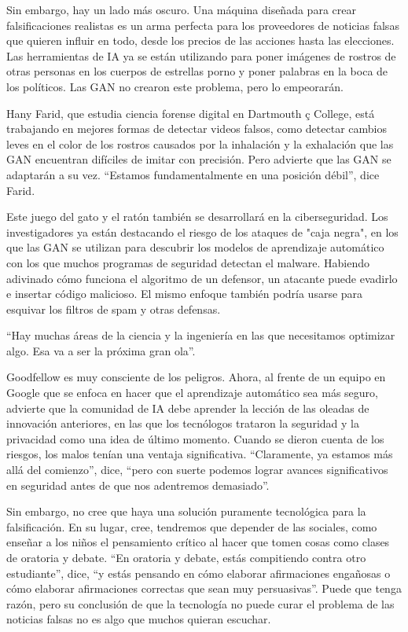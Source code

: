 \documentclass[a4paper]{article}
\begin{document}
Sin embargo, hay un lado más oscuro. Una máquina diseñada para crear falsificaciones realistas 
es un arma perfecta para los proveedores de noticias falsas que quieren influir en todo, desde 
los precios de las acciones hasta las elecciones. Las herramientas de IA ya se están utilizando 
para poner imágenes de rostros de otras personas en los cuerpos de estrellas porno y poner 
palabras en la boca de los políticos. Las GAN no crearon este problema, pero lo empeorarán.
 
Hany Farid, que estudia ciencia forense digital en Dartmouth ç College, está trabajando en 
mejores formas de detectar videos  falsos, como detectar cambios leves en el color de los 
rostros  causados por la inhalación y la exhalación que las GAN encuentran difíciles de imitar 
con precisión. Pero advierte que las GAN se  adaptarán a su vez. ``Estamos fundamentalmente en 
una posición  débil'', dice Farid.


Este juego del gato y el ratón también se desarrollará en la ciberseguridad. Los investigadores 
ya están destacando el riesgo de los ataques de "caja negra", en los que las GAN se utilizan 
para descubrir los modelos de aprendizaje automático con los que muchos programas de seguridad 
detectan el malware. Habiendo adivinado cómo funciona el algoritmo de un defensor, un atacante 
puede evadirlo e insertar código malicioso. El mismo enfoque también podría usarse para esquivar 
los filtros de spam y otras defensas.

``Hay muchas áreas de la ciencia y la ingeniería en las que necesitamos optimizar algo. Esa va 
a ser la próxima gran ola''.

Goodfellow es muy consciente de los peligros. Ahora, al frente de un equipo en Google que se 
enfoca en hacer que el aprendizaje automático sea más seguro, advierte que la comunidad de IA 
debe aprender la lección de las oleadas de innovación anteriores, en las que los tecnólogos 
trataron la seguridad y la privacidad como una idea de último momento. Cuando se dieron cuenta 
de los riesgos, los malos tenían una ventaja significativa. ``Claramente, ya estamos más allá 
del comienzo'', dice, ``pero con suerte podemos lograr avances significativos en seguridad antes 
de que nos adentremos demasiado''.

Sin embargo, no cree que haya una solución puramente tecnológica para la falsificación. En su 
lugar, cree, tendremos que depender de las sociales, como enseñar a los niños el pensamiento 
crítico al hacer que tomen cosas como clases de oratoria y debate. ``En oratoria y debate, estás 
compitiendo contra otro estudiante'', dice, ``y estás pensando en cómo elaborar afirmaciones 
engañosas o cómo elaborar afirmaciones correctas que sean muy persuasivas''. Puede que tenga 
razón, pero su conclusión de que la tecnología no puede curar el problema de las noticias falsas 
no es algo que muchos quieran escuchar.
\end{document}
